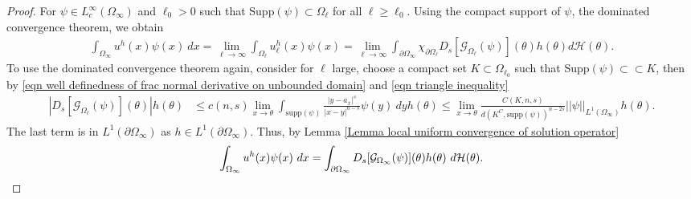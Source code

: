 \documentclass{amsart}
\newcommand{\g}[1]{\mathcal{G}_{#1}}
\newcommand{\Ds}{D_{s}}
\newcommand{\ul}{u_{\ell}}
\begin{document}
\begin{proof}
         For $\psi\in L^{\infty}_{c}(\Omega_{\infty})$ and $\ell_{0}>0$ such that Supp$(\psi)\subset \Omega_{\ell}$ for all $\ell\geq \ell_{0}$. Using the compact support of $\psi$, the dominated convergence theorem, %
         we obtain
\begin{equation*}
\begin{split}
    \int_{\Omega_{\infty}}u^{h}(x)\psi(x)\ dx=\lim_{\ell\to\infty}\int_{\Omega_{\ell}}\ul^{h}(x) \psi(x) 
=\lim_{\ell\to\infty}\int_{\partial\Omega_{\infty}} \chi_{\partial\Omega_{\ell}} \Ds [\g{\Omega_{\ell}}(\psi)](\theta)  h(\theta)  d\mathcal{H}(\theta).
    \end{split}
\end{equation*}
To use the dominated convergence theorem again, consider for $\ell$ large, choose a compact set $K\subset\Omega_{\ell_{0}}$ such that Supp$(\psi)\subset\subset K$, then by %
\eqref{eqn well definedness of frac normal derivative on unbounded domain} and \eqref{eqn triangle inequality}
\begin{equation*}
\begin{split}
     |\Ds [\g{\Omega_{\ell}}(\psi)](\theta)| h(\theta)
    &\leq c(n,s)\lim_{x\to\theta}\int_{\text{supp}(\psi)}\frac{|y-a_x|^{s}}{|x-y|^{n-s}}\psi(y)\ dy h(\theta) 
    \leq \lim_{ x\to\theta}\frac{C(K,n,s)}{d(K^{C},\text{supp}(\psi))^{n-2s}}||\psi||_{L^{1}(\Omega_{\infty})} h(\theta).
    \end{split}
\end{equation*}
The last term is in $L^{1}(\partial\Omega_{\infty})$ as $h\in L^{1}(\partial\Omega_{\infty})$.  Thus, by Lemma \ref{Lemma local uniform convergence of solution operator}
\begin{equation*}
   \int_{\Omega_{\infty}}u^{h}(x) \psi(x)\ dx =\int_{\partial\Omega_{\infty}}\Ds[\g{\Omega_{\infty}}(\psi)](\theta)h(\theta)\ d\mathcal{H}(\theta).\qedhere
\end{equation*}
\end{proof}
\end{document}
